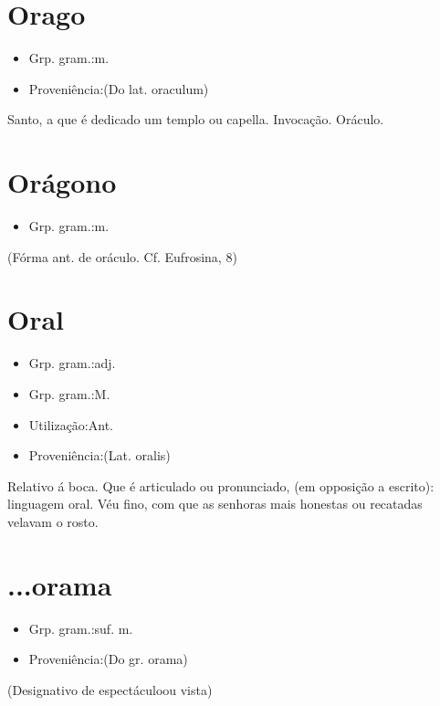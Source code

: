 \section{Orago}
\begin{itemize}
\item {Grp. gram.:m.}
\end{itemize}
\begin{itemize}
\item {Proveniência:(Do lat. \textunderscore oraculum\textunderscore )}
\end{itemize}
Santo, a que é dedicado um templo ou capella.
Invocação.
Oráculo.
\section{Orágono}
\begin{itemize}
\item {Grp. gram.:m.}
\end{itemize}
(Fórma ant. de \textunderscore oráculo\textunderscore . Cf. \textunderscore Eufrosina\textunderscore , 8)
\section{Oral}
\begin{itemize}
\item {Grp. gram.:adj.}
\end{itemize}
\begin{itemize}
\item {Grp. gram.:M.}
\end{itemize}
\begin{itemize}
\item {Utilização:Ant.}
\end{itemize}
\begin{itemize}
\item {Proveniência:(Lat. \textunderscore oralis\textunderscore )}
\end{itemize}
Relativo á boca.
Que é articulado ou pronunciado, (em opposição a \textunderscore escrito\textunderscore ): \textunderscore linguagem oral\textunderscore .
Véu fino, com que as senhoras mais honestas ou recatadas velavam o rosto.
\section{...orama}
\begin{itemize}
\item {Grp. gram.:suf. m.}
\end{itemize}
\begin{itemize}
\item {Proveniência:(Do gr. \textunderscore orama\textunderscore )}
\end{itemize}
(Designativo de \textunderscore espectáculo\textunderscore  ou \textunderscore vista\textunderscore )
